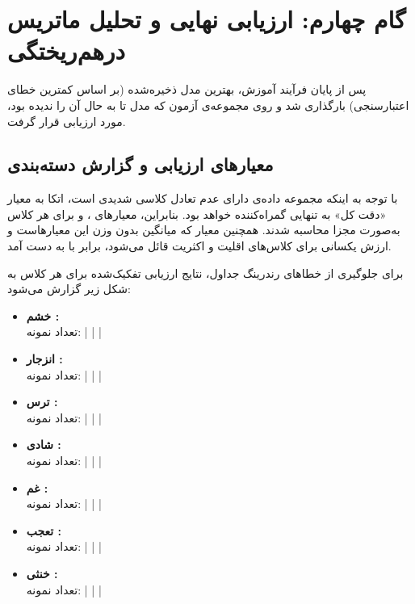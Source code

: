 \section{گام چهارم: ارزیابی نهایی و تحلیل ماتریس درهم‌ریختگی}

پس از پایان فرآیند آموزش، بهترین مدل ذخیره‌شده (بر اساس کمترین خطای اعتبارسنجی) بارگذاری شد و روی مجموعه‌ی آزمون  که مدل تا به حال آن را ندیده بود، مورد ارزیابی قرار گرفت. 

\subsection{معیارهای ارزیابی و گزارش دسته‌بندی}
با توجه به اینکه مجموعه داده‌ی  دارای عدم تعادل کلاسی  شدیدی است، اتکا به معیار «دقت کل»  به تنهایی گمراه‌کننده خواهد بود. بنابراین، معیارهای ،  و  برای هر کلاس به‌صورت مجزا محاسبه شدند. همچنین معیار  که میانگین بدون وزن این معیارهاست و ارزش یکسانی برای کلاس‌های اقلیت و اکثریت قائل می‌شود، برابر با  به دست آمد.

برای جلوگیری از خطاهای رندرینگ جداول، نتایج ارزیابی تفکیک‌شده برای هر کلاس به شکل زیر گزارش می‌شود:

\begin{itemize}
    \item \textbf{خشم :} \\
    تعداد نمونه:  |  |  | 
    
    \item \textbf{انزجار :} \\
    تعداد نمونه:  |  |  | 
    
    \item \textbf{ترس :} \\
    تعداد نمونه:  |  |  | 
    
    \item \textbf{شادی :} \\
    تعداد نمونه:  |  |  | 
    
    \item \textbf{غم :} \\
    تعداد نمونه:  |  |  | 
    
    \item \textbf{تعجب :} \\
    تعداد نمونه:  |  |  | 
    
    \item \textbf{خنثی :} \\
    تعداد نمونه:  |  |  | 
\end{itemize}

